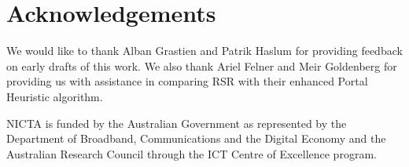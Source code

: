 \section{Acknowledgements}
We would like to thank Alban Grastien and Patrik Haslum for providing feedback
on early drafts of this work. 
We also thank Ariel Felner and Meir Goldenberg for providing us with assistance
in comparing RSR with their enhanced Portal Heuristic algorithm.

NICTA is funded by the Australian Government as represented by the Department of 
Broadband, Communications and the Digital Economy and the Australian Research 
Council through the ICT Centre of Excellence program.
